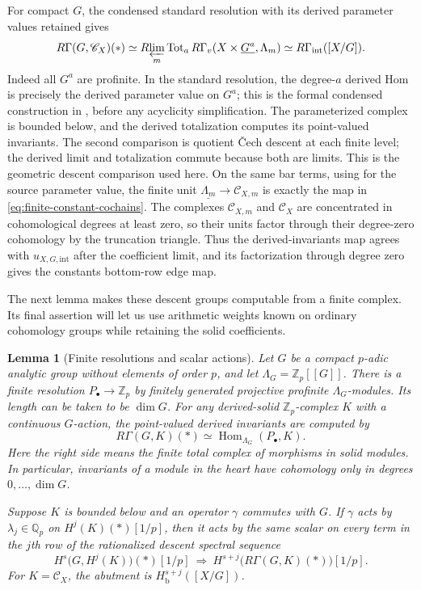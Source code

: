 \documentclass[11pt]{article}
\numberwithin{equation}{section}
\newtheorem{lemma}[theorem]{Lemma}
\theoremstyle{definition}
\theoremstyle{remark}
\begin{document}
For compact $G$, the condensed standard resolution with its derived
parameter values retained gives
\begin{equation}\label{eq:geometric-group-descent}
 R\Gamma(G,\mathscr C_X)(*)\simeq
 R\!\varprojlim_m\operatorname{Tot}_{a}R\Gamma_v
        (X\times\underline{G^a},\Lambda_m)
 \simeq R\Gamma_{\mathrm{int}}([X/G]).
\end{equation}
Indeed all $G^a$ are profinite.  In the standard resolution, the
degree-$a$ derived Hom is precisely the derived parameter value on
$G^a$; this is the formal condensed construction in
\cite[\S2, pp.~5--6]{Anschutz2020}, before any acyclicity simplification.
The parameterized complex is bounded below, and the derived
totalization computes its point-valued invariants.  The second
comparison is quotient \v{C}ech descent at each finite level; the
derived limit and totalization commute because both are limits.
This is the geometric descent comparison used here.  On the same bar
terms, using \cite[Lemma~2.2]{Anschutz2020} for the source parameter
value, the finite unit $\underline{\Lambda_m}\to\mathscr C_{X,m}$
is exactly the map in \eqref{eq:finite-constant-cochains}.  The complexes
$\mathscr C_{X,m}$ and $\mathscr C_X$ are concentrated in cohomological
degrees at least zero, so their units factor through their degree-zero
cohomology by the truncation triangle.  Thus the derived-invariants map
agrees with $u_{X,G,\mathrm{int}}$ after the coefficient limit, and its
factorization through degree zero gives the constants bottom-row edge map.

The next lemma makes these descent groups computable from a finite
complex. Its final assertion will let us use arithmetic weights known
on ordinary cohomology groups while retaining the solid coefficients.

\begin{lemma}[Finite resolutions and scalar actions]
\label{lem:solid-resolutions}
Let $G$ be a compact $p$-adic analytic group without elements of order
$p$, and let $\Lambda_G=\mathbb Z_p[[G]]$.  There is a finite resolution
$P_\bullet\to\mathbb Z_p$ by finitely generated projective profinite
$\Lambda_G$-modules.  Its length can be taken to be $\dim G$.
For any derived-solid $\mathbb Z_p$-complex $K$ with a continuous $G$-action,
the point-valued derived invariants are computed by
\begin{equation}
\label{eq:finite-resolution}
 R\Gamma(G,K)(*)\simeq
 \operatorname{Hom}_{\Lambda_G}(P_\bullet,K).
\end{equation}
Here the right side means the finite total complex of morphisms in
solid modules.  In particular, invariants of a module in the heart
have cohomology only in degrees $0,\ldots,\dim G$.

Suppose $K$ is bounded below and an operator $\gamma$ commutes with
$G$.  If $\gamma$ acts by $\lambda_j\in\mathbb Q_p$ on $H^j(K)(*)[1/p]$,
then it acts by the same scalar on every term in the $j$th row of
the rationalized descent spectral sequence
\[
 H^s\bigl(G,H^j(K)\bigr)(*)[1/p]
       \ \Longrightarrow\ H^{s+j}\bigl(R\Gamma(G,K)(*)\bigr)[1/p].
\]
For $K=\mathscr C_X$, the abutment is $H^{s+j}_{\mathrm b}([X/G])$.
\end{lemma}
\end{document}
